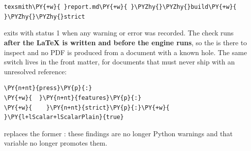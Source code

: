 \documentclass[a4paper,twoside]{article}
\begin{document}
\section{}
\begin{tscode}[lang=sh, engine=pygments]
\begin{Verbatim}[commandchars=\\\{\},breaklines, breakanywhere, commandchars=\\\{\}]
texsmith\PY{+w}{ }report.md\PY{+w}{ }\PYZhy{}\PYZhy{}build\PY{+w}{ }\PYZhy{}\PYZhy{}strict
\end{Verbatim}
\end{tscode}
 exits with status 1 when any warning or error was recorded. The
check runs \textbf{after the \LaTeX{} is written and before the engine runs}, so the
 is there to inspect and no PDF is produced from a document with a known
hole. The same switch lives in the front matter, for documents that must never
ship with an unresolved reference:
\begin{tscode}[lang=yaml, engine=pygments]
\begin{Verbatim}[commandchars=\\\{\},breaklines, breakanywhere, commandchars=\\\{\}]
\PY{n+nt}{press}\PY{p}{:}
\PY{+w}{  }\PY{n+nt}{features}\PY{p}{:}
\PY{+w}{    }\PY{n+nt}{strict}\PY{p}{:}\PY{+w}{ }\PY{l+lScalar+lScalarPlain}{true}
\end{Verbatim}
\end{tscode}
 replaces the former : these findings are no
longer Python warnings and that variable no longer promotes them.
\end{document}
